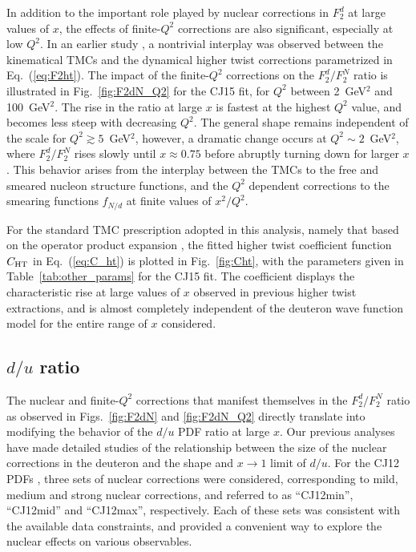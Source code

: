 \documentclass[aps,prd,amsmath,preprint]{revtex4}
\begin{document}
In addition to the important role played by nuclear corrections
in $F_2^d$ at large values of $x$, the effects of finite-$Q^2$
corrections are also significant, especially at low $Q^2$.
In an earlier study \cite{CJ10}, a nontrivial interplay was
observed between the kinematical TMCs and the dynamical higher
twist corrections parametrized in Eq.~(\ref{eq:F2ht}).
The impact of the finite-$Q^2$ corrections on the $F_2^d/F_2^N$
ratio is illustrated in Fig.~\ref{fig:F2dN_Q2} for the CJ15
fit, for $Q^2$ between 2~GeV$^2$ and 100~GeV$^2$.
The rise in the ratio at large $x$ is fastest at the highest
$Q^2$ value, and becomes less steep with decreasing $Q^2$.
The general shape remains independent of the scale for
$Q^2 \gtrsim 5$~GeV$^2$, however, a dramatic change occurs at
$Q^2 \sim 2$~GeV$^2$, where $F_2^d/F_2^N$ rises slowly until
$x \approx 0.75$ before abruptly turning down for larger $x$.
This behavior arises from the interplay between the TMCs to
the free and smeared nucleon structure functions, and the
$Q^2$ dependent corrections to the smearing functions $f_{N/d}$
at finite values of $x^2/Q^2$.


For the standard TMC prescription adopted in this analysis,
namely that based on the operator product expansion \cite{GP76},
the fitted higher twist coefficient function $C_{\rm HT}$
in Eq.~(\ref{eq:C_ht}) is plotted in Fig.~\ref{fig:Cht},
with the parameters given in Table~\ref{tab:other_params}
for the CJ15 fit.
The coefficient displays the characteristic rise at large values
of $x$ observed in previous higher twist extractions, and is
almost completely independent of the deuteron wave function
model for the entire range of $x$ considered.


\subsection{$d/u$ ratio}
\label{ssec:du}

The nuclear and finite-$Q^2$ corrections that manifest themselves
in the $F_2^d/F_2^N$ ratio as observed in Figs.~\ref{fig:F2dN} and
\ref{fig:F2dN_Q2} directly translate into modifying the behavior
of the $d/u$ PDF ratio at large $x$.  Our previous analyses
\cite{CJ10, CJ11, CJ12} have made detailed studies of the
relationship between the size of the nuclear corrections in
the deuteron and the shape and $x \to 1$ limit of $d/u$.
For the CJ12 PDFs \cite{CJ12}, three sets of nuclear corrections
were considered, corresponding to mild, medium and strong nuclear
corrections, and referred to as ``CJ12min'', ``CJ12mid'' and
``CJ12max'', respectively.  Each of these sets was consistent
with the available data constraints, and provided a convenient
way to explore the nuclear effects on various observables.
\end{document}
